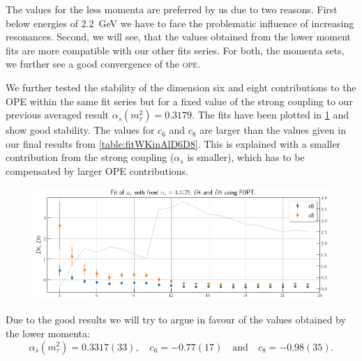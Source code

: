 \documentclass[../../index.tex]{subfiles}
\begin{document}
The values for the less momenta are preferred by us due to two reasons. First
below energies of \SI{2.2}{\giga\eV} we have to face the problematic influence
of increasing resonances. Second, we will see, that the values obtained from the
lower moment fits are more compatible with our other fits series. For both, the
momenta sets, we further see a good convergence of the \textsc{ope}.

We further tested the stability of the dimension six and eight contributions to
the OPE within the same fit series but for a fixed value of the strong coupling 
to our previous averaged result $\alpha_s(m_\tau^2)=0.3179$. The fits have been
plotted in \cref{fig:fitWKinD6D8} and show good stability. The values for $c_6$
and $c_8$ are larger than the values given in our final results from
\cref{table:fitWKinAlD6D8}. This is explained with a smaller contribution from
the strong coupling ($\alpha_s$ is smaller), which has to be compensated by
larger OPE contributions. 
\begin{figure}
  \centering
  \includegraphics[width=\textwidth]{./images/fitWKinD6D8.png}
  \caption{}
  \label{fig:fitWKinD6D8}
\end{figure}

Due to the good results we will try to argue in favour of the values obtained by
the lower momenta:
\begin{equation}
  \label{eq:wKinResult}
  \alpha_s(m_\tau^2) = 0.3317(33), \quad c_6 = -0.77(17) \quad \text{and} \quad
  c_8 = -0.98(35).
\end{equation}
\end{document}

